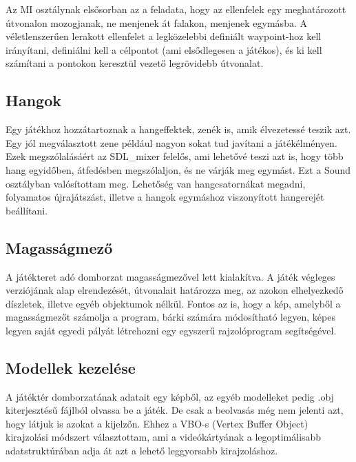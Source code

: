 
Az MI osztálynak elsősorban az a feladata, hogy az ellenfelek egy meghatározott útvonalon mozogjanak, ne menjenek át falakon, menjenek egymásba. A véletlenszerűen lerakott ellenfelet a legközelebbi definiált waypoint-hoz kell irányítani, definiálni kell a célpontot (ami elsődlegesen a játékos), és ki kell számítani a pontokon keresztül vezető legrövidebb útvonalat.

\subsection{Hangok}


Egy játékhoz hozzátartoznak a hangeffektek, zenék is, amik élvezetessé teszik azt. Egy jól megválasztott zene például nagyon sokat tud javítani a játékélményen. Ezek megszólalásáért az SDL\_mixer felelős, ami lehetővé teszi azt is, hogy több hang egyidőben, átfedésben megszólaljon, és ne várják meg egymást. Ezt a Sound osztályban valósítottam meg. Lehetőség van hangcsatornákat megadni, folyamatos újrajátszást, illetve a hangok egymáshoz viszonyított hangerejét beállítani.

\subsection{Magasságmező}

A játékteret adó domborzat magasságmezővel lett kialakítva. A játék végleges verziójának alap elrendezését, útvonalait határozza meg, az azokon elhelyezkedő díszletek, illetve egyéb objektumok nélkül. Fontos az is, hogy a kép, amelyből a magasságmezőt számolja a program, bárki számára módosítható legyen, képes legyen saját egyedi pályát létrehozni egy egyszerű rajzolóprogram segítségével.

\subsection{Modellek kezelése}

A játéktér domborzatának adatait egy képből, az egyéb modelleket pedig .obj kiterjesztésű fájlból olvassa be a játék. De csak a beolvasás még nem jelenti azt, hogy látjuk is azokat a kijelzőn. Ehhez a VBO-s (Vertex Buffer Object) kirajzolási módszert választottam, ami a videókártyának a legoptimálisabb adatstruktúrában adja át azt a lehető leggyorsabb kirajzoláshoz.

